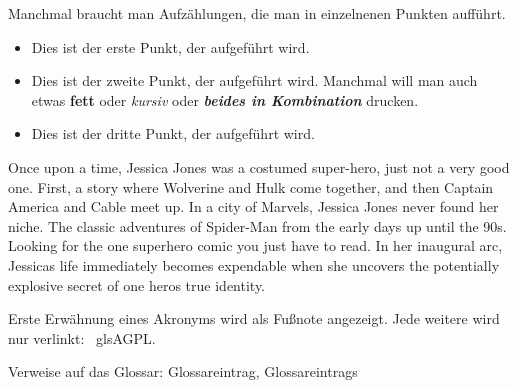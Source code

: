 Manchmal braucht man Aufzählungen, die man in einzelnenen Punkten aufführt.
\begin{itemize}
\item Dies ist der erste Punkt, der aufgeführt wird.
\item Dies ist der zweite Punkt, der aufgeführt wird. Manchmal will man auch etwas \textbf{fett} oder \textit{kursiv} oder \textbf{\textit{beides in Kombination}}  drucken.
\item Dies ist der dritte Punkt, der aufgeführt wird.
\end{itemize}

Once upon a time, Jessica Jones was a costumed super-hero, just not a very good one. First, a story where Wolverine and Hulk come together, and then Captain America and Cable meet up. In a city of Marvels, Jessica Jones never found her niche. The classic adventures of Spider-Man from the early days up until the 90s. Looking for the one superhero comic you just have to read. In her inaugural arc, Jessicas life immediately becomes expendable when she uncovers the potentially explosive secret of one heros true identity.

Erste Erwähnung eines Akronyms wird als Fußnote angezeigt. Jede weitere wird
nur verlinkt: \ gls{AGPL}.

Verweise auf das Glossar: \gls{Glossareintrag}, \glspl{Glossareintrag}

